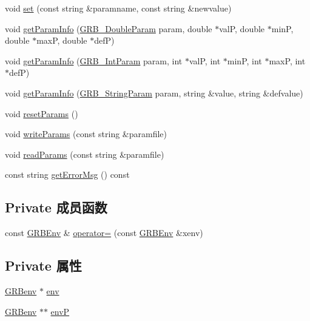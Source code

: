 \begin{DoxyCompactItemize}
\item 
void \hyperlink{classGRBEnv_a7e076fcc7f772b56f247fc4dbd376917}{set} (const string \&paramname, const string \&newvalue)
\item 
void \hyperlink{classGRBEnv_a2307d1763c215e44ba1a9006de210ecf}{get\+Param\+Info} (\hyperlink{gurobi__c_09_09_8h_a4703eabc6bd97595ee1d0b3241981772}{G\+R\+B\+\_\+\+Double\+Param} param, double $\ast$valP, double $\ast$minP, double $\ast$maxP, double $\ast$defP)
\item 
void \hyperlink{classGRBEnv_acd3dcb4f007b51ac0724fc4701489cd2}{get\+Param\+Info} (\hyperlink{gurobi__c_09_09_8h_ab02a171b88b53892fce22c6426a9d166}{G\+R\+B\+\_\+\+Int\+Param} param, int $\ast$valP, int $\ast$minP, int $\ast$maxP, int $\ast$defP)
\item 
void \hyperlink{classGRBEnv_a925b2c44fcdc1c3f73d0030bd3baa3b9}{get\+Param\+Info} (\hyperlink{gurobi__c_09_09_8h_a7ed46434ddcd973e46a3acd4d6c2cf04}{G\+R\+B\+\_\+\+String\+Param} param, string \&value, string \&defvalue)
\item 
void \hyperlink{classGRBEnv_ab9961b41498c1ac27a9b636f630d4d19}{reset\+Params} ()
\item 
void \hyperlink{classGRBEnv_a0fab9f92af27e787f9f2271df0c6262f}{write\+Params} (const string \&paramfile)
\item 
void \hyperlink{classGRBEnv_a030dde91644684c2118031a5ace34d11}{read\+Params} (const string \&paramfile)
\item 
const string \hyperlink{classGRBEnv_ab885068657ab5f74109d350415890072}{get\+Error\+Msg} () const 
\end{DoxyCompactItemize}
\subsection*{Private 成员函数}
\begin{DoxyCompactItemize}
\item 
const \hyperlink{classGRBEnv}{G\+R\+B\+Env} \& \hyperlink{classGRBEnv_acac68ecf2c8e672377cf8227182fcee0}{operator=} (const \hyperlink{classGRBEnv}{G\+R\+B\+Env} \&xenv)
\end{DoxyCompactItemize}
\subsection*{Private 属性}
\begin{DoxyCompactItemize}
\item 
\hyperlink{gurobi__c_8h_a2963ba0c46b86ac4680fb3bb4ca8b2f3}{G\+R\+Benv} $\ast$ \hyperlink{classGRBEnv_a73432e3a07386ee4a3669f67137ec1cc}{env}
\item 
\hyperlink{gurobi__c_8h_a2963ba0c46b86ac4680fb3bb4ca8b2f3}{G\+R\+Benv} $\ast$$\ast$ \hyperlink{classGRBEnv_aa55900386bf034ad127526269ad6465b}{envP}
\end{DoxyCompactItemize}
